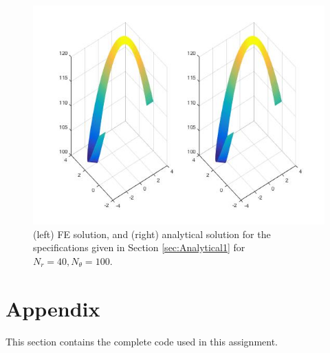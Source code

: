 \documentclass[10pt]{article}
\begin{document}
\begin{figure}[H]
  \centering
  \includegraphics[width=15cm]{Soln1.jpg}
  \caption{(left) FE solution, and (right) analytical solution for the specifications given in Section \ref{sec:Analytical1} for \(N_r=40, N_\theta=100\).}
  \label{fig:Mesh}
\end{figure}




\section{Appendix}

This section contains the complete code used in this assignment. 

\end{document}
